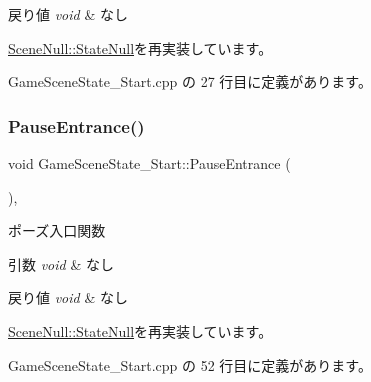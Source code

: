 \begin{DoxyRetVals}{戻り値}
{\em void} & なし \\
\hline
\end{DoxyRetVals}


\mbox{\hyperlink{class_scene_null_1_1_state_null_ac0b3f1adf01b580144337e37a847131f}{Scene\+Null\+::\+State\+Null}}を再実装しています。



 Game\+Scene\+State\+\_\+\+Start.\+cpp の 27 行目に定義があります。

\mbox{\label{class_game_scene_state___start_a7f1b9f52bfb791622ca589ebd970dade}} 
\subsubsection{\texorpdfstring{Pause\+Entrance()}{PauseEntrance()}}
{\footnotesize\ttfamily void Game\+Scene\+State\+\_\+\+Start\+::\+Pause\+Entrance (\begin{DoxyParamCaption}{ }\end{DoxyParamCaption})\hspace{0.3cm}{\ttfamily [override]}, {\ttfamily [virtual]}}



ポーズ入口関数 


\begin{DoxyParams}{引数}
{\em void} & なし \\
\hline
\end{DoxyParams}

\begin{DoxyRetVals}{戻り値}
{\em void} & なし \\
\hline
\end{DoxyRetVals}


\mbox{\hyperlink{class_scene_null_1_1_state_null_a0a14205bef6c8f73c3ef6b785b104f02}{Scene\+Null\+::\+State\+Null}}を再実装しています。



 Game\+Scene\+State\+\_\+\+Start.\+cpp の 52 行目に定義があります。

\mbox{\label{class_game_scene_state___start_a667dd2400867b901ca8f2ce3a4f7d367}} 
